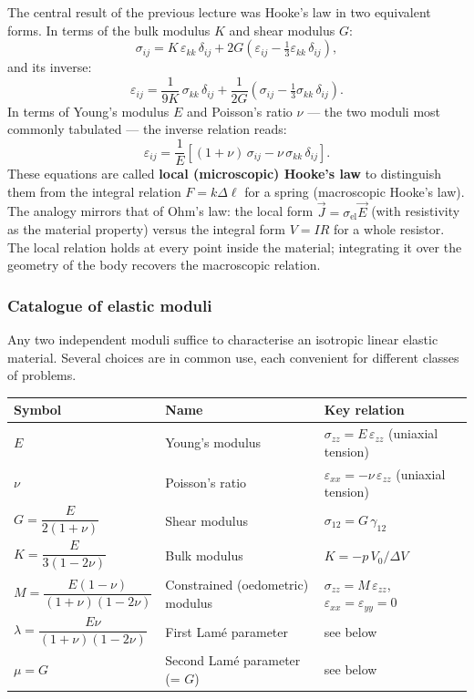 The central result of the previous lecture was Hooke's law in two equivalent forms. In terms of the bulk modulus $K$ and shear modulus $G$:
\begin{equation}
    \sigma_{ij} = K\,\varepsilon_{kk}\,\delta_{ij}
                  + 2G\!\left(\varepsilon_{ij} - \tfrac{1}{3}\varepsilon_{kk}\,\delta_{ij}\right),
    \label{eq:hooke_KG_recap}
\end{equation}
and its inverse:
\begin{equation}
    \varepsilon_{ij} = \frac{1}{9K}\,\sigma_{kk}\,\delta_{ij}
                       + \frac{1}{2G}\!\left(\sigma_{ij} - \tfrac{1}{3}\sigma_{kk}\,\delta_{ij}\right).
    \label{eq:hooke_inv_recap}
\end{equation}
In terms of Young's modulus $E$ and Poisson's ratio $\nu$ — the two moduli most commonly tabulated — the inverse relation reads:
\begin{equation}
    \varepsilon_{ij} = \frac{1}{E}\!\left[(1+\nu)\,\sigma_{ij} - \nu\,\sigma_{kk}\,\delta_{ij}\right].
    \label{eq:hooke_Enu}
\end{equation}
These equations are called \textbf{local (microscopic) Hooke's law} to distinguish them from the integral relation $F = k\Delta\ell$ for a spring (macroscopic Hooke's law). The analogy mirrors that of Ohm's law: the local form $\vec{J} = \sigma_{\mathrm{el}}\vec{E}$ (with resistivity as the material property) versus the integral form $V = IR$ for a whole resistor. The local relation holds at every point inside the material; integrating it over the geometry of the body recovers the macroscopic relation.

\subsubsection*{Catalogue of elastic moduli}

Any two independent moduli suffice to characterise an isotropic linear elastic material. Several choices are in common use, each convenient for different classes of problems.

\begin{center}
\begin{tabular}{lll}
\toprule
Symbol & Name & Key relation \\
\midrule
$E$ & Young's modulus & $\sigma_{zz} = E\,\varepsilon_{zz}$ (uniaxial tension) \\
$\nu$ & Poisson's ratio & $\varepsilon_{xx} = -\nu\,\varepsilon_{zz}$ (uniaxial tension) \\
$G = \dfrac{E}{2(1+\nu)}$ & Shear modulus & $\sigma_{12} = G\,\gamma_{12}$ \\
$K = \dfrac{E}{3(1-2\nu)}$ & Bulk modulus & $K = -p\,V_0/\Delta V$ \\
$M = \dfrac{E(1-\nu)}{(1+\nu)(1-2\nu)}$ & Constrained (oedometric) modulus & $\sigma_{zz}=M\,\varepsilon_{zz}$, $\varepsilon_{xx}=\varepsilon_{yy}=0$ \\
$\lambda = \dfrac{E\nu}{(1+\nu)(1-2\nu)}$ & First Lamé parameter & see below \\
$\mu = G$ & Second Lamé parameter (= $G$) & see below \\
\bottomrule
\end{tabular}
\end{center}

